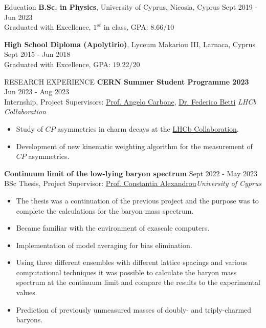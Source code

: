 \documentclass{resume} %
\begin{document}
\begin{rSection}{Education}
{\bf B.Sc. in Physics}, University of Cyprus, Nicosia, Cyprus \hfill {Sept 2019 - Jun 2023}\\
Graduated with Excellence, $1^{st}$ in class, GPA: $8.66/10$

{\bf High School Diploma (Apolytirio)}, Lyceum Makariou III, Larnaca, Cyprus \hfill {Sept 2015 - Jun 2018}\\
Graduated with Excellence, GPA: $19.22/20$
\end{rSection}

\bigbreak

\begin{rSection}{RESEARCH EXPERIENCE}
\textbf{CERN Summer Student Programme 2023} \hfill Jun 2023 - Aug 2023\\
Internship, Project Supervisors: \href{https://www.unibo.it/sitoweb/angelo.carbone/en}{Prof. Angelo Carbone}, \href{https://www.ph.ed.ac.uk/people/federico-betti}{Dr. Federico Betti}
\hfill \textit{LHCb Collaboration}
\begin{itemize}
\itemsep -3pt {}
\item Study of $CP$ asymmetries in charm decays at the \href{https://lhcb.web.cern.ch/}{LHCb Collaboration}.
\item Development of new kinematic weighting algorithm for the measurement of $CP$ asymmetries.
\end{itemize}

\textbf{Continuum limit of the low-lying baryon spectrum} \hfill Sept 2022 - May 2023\\
BSc Thesis, Project Supervisor:  \href{https://www.cyi.ac.cy/index.php/castorc/about-the-center/castorc-our-people/itemlist/user/99-constantia-alexandrou.html}{Prof. Constantia Alexandrou}\hfill \textit{University of Cyprus}
\begin{itemize}
\itemsep -3pt {} 
\item The thesis was a continuation of the previous project and the purpose was to complete the calculations for the baryon mass spectrum.
\item Became familiar with the environment of exascale computers.
\item Implementation of model averaging for bias elimination.
\item Using three different ensembles with different lattice spacings and various computational techniques it was possible to calculate the baryon mass spectrum at the continuum limit and compare the results to the experimental values.
\item Prediction of previously unmeasured masses of doubly- and triply-charmed baryons.
\end{itemize}


\end{rSection}
\end{document}
